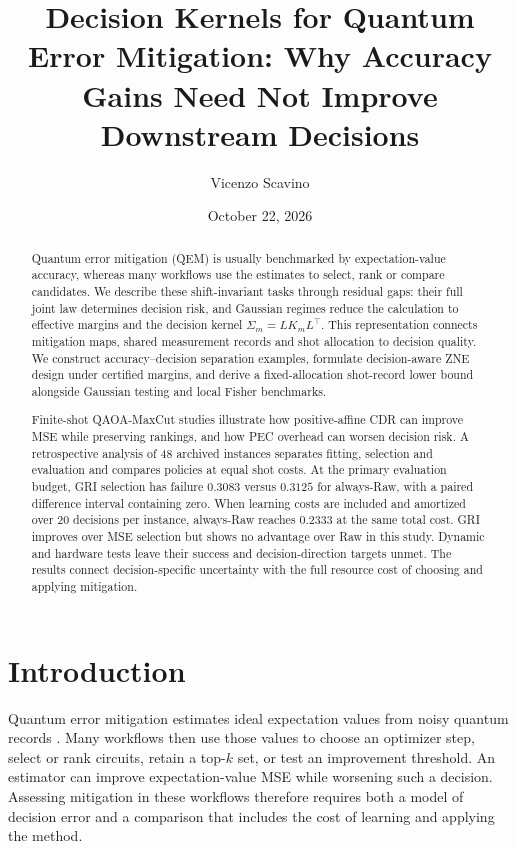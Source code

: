 \documentclass[a4paper,onecolumn,unpublished,nopdfoutputerror]{quantumarticle}
\title{Decision Kernels for Quantum Error Mitigation: Why Accuracy Gains Need Not Improve Downstream Decisions}
\author{Vicenzo Scavino}
\affiliation{Independent Researcher}
\date{October 22, 2026}
\theoremstyle{plain}
\theoremstyle{definition}
\newcommand{\1}{\mathbf{1}}
\begin{document}
\begin{abstract}
Quantum error mitigation (QEM) is usually benchmarked by expectation-value accuracy, whereas many workflows use the estimates to select, rank or compare candidates. We describe these shift-invariant tasks through residual gaps: their full joint law determines decision risk, and Gaussian regimes reduce the calculation to effective margins and the decision kernel $\Sigma_m=LK_mL^\top$. This representation connects mitigation maps, shared measurement records and shot allocation to decision quality. We construct accuracy--decision separation examples, formulate decision-aware ZNE design under certified margins, and derive a fixed-allocation shot-record lower bound alongside Gaussian testing and local Fisher benchmarks.

Finite-shot QAOA-MaxCut studies illustrate how positive-affine CDR can improve MSE while preserving rankings, and how PEC overhead can worsen decision risk. A retrospective analysis of 48 archived instances separates fitting, selection and evaluation and compares policies at equal shot costs. At the primary evaluation budget, GRI selection has failure $0.3083$ versus $0.3125$ for always-Raw, with a paired difference interval containing zero. When learning costs are included and amortized over 20 decisions per instance, always-Raw reaches $0.2333$ at the same total cost. GRI improves over MSE selection but shows no advantage over Raw in this study. Dynamic and hardware tests leave their success and decision-direction targets unmet. The results connect decision-specific uncertainty with the full resource cost of choosing and applying mitigation.

\end{abstract}
\maketitle

\section{Introduction}

Quantum error mitigation estimates ideal expectation values from noisy quantum records \cite{Cai2023}. Many workflows then use those values to choose an optimizer step, select or rank circuits, retain a top-$k$ set, or test an improvement threshold. An estimator can improve expectation-value MSE while worsening such a decision. Assessing mitigation in these workflows therefore requires both a model of decision error and a comparison that includes the cost of learning and applying the method.
\end{document}
